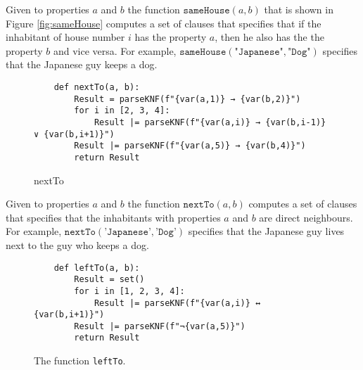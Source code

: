Given to properties $a$ and $b$ the function $\texttt{sameHouse}(a, b)$ that is
shown in Figure \ref{fig:sameHouse} computes
a set of clauses that specifies that if the inhabitant of house number $i$ has
the property $a$, then he also has the the property $b$ and vice versa.  For
example, $\texttt{sameHouse}(\texttt{"Japanese"}, \texttt{"Dog"})$ specifies
that the Japanese guy keeps a dog. 


\begin{figure}[!ht]
\centering
\begin{verbatim}
    def nextTo(a, b):
        Result = parseKNF(f"{var(a,1)} → {var(b,2)}")
        for i in [2, 3, 4]:
            Result |= parseKNF(f"{var(a,i)} → {var(b,i-1)} ∨ {var(b,i+1)}")
        Result |= parseKNF(f"{var(a,5)} → {var(b,4)}")
        return Result
\end{verbatim}
\vspace*{-0.3cm}
\caption{nextTo}
\label{fig:nextTo}
\end{figure}
Given to properties $a$ and $b$ the function $\texttt{nextTo}(a, b)$ computes a
set of clauses that specifies that the inhabitants with properties $a$ and $b$
are direct neighbours.  For example, $\texttt{nextTo}(\texttt{'Japanese'}, \texttt{'Dog'})$
specifies that the Japanese guy lives next to the guy who keeps a dog. 


\begin{figure}[!ht]
\centering
\begin{verbatim}
    def leftTo(a, b):
        Result = set()
        for i in [1, 2, 3, 4]:
            Result |= parseKNF(f"{var(a,i)} ↔ {var(b,i+1)}")
        Result |= parseKNF(f"¬{var(a,5)}")
        return Result
\end{verbatim}
\vspace*{-0.3cm}
\caption{The function \texttt{leftTo}.}
\label{fig:leftTo}
\end{figure}

